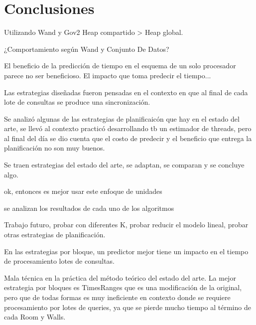 \chapter{Conclusiones}
\label{cap:conclu}

Utilizando Wand y Gov2 Heap compartido > Heap global.

¿Comportamiento según Wand y Conjunto De Datos? 

El beneficio de la predicción de tiempo en el esquema de un solo procesador parece no ser beneficioso. 
El impacto que toma predecir el tiempo...

Las estrategias diseñadas fueron pensadas en el contexto en que al final de cada lote de consultas se produce una sincronización.

Se analizó algunas de las estrategias de planificaicón que hay en el estado del arte, se llevó al contexto practicó desarrollando tb un estimador de threads, pero al final del día se dio cuenta que el costo de predecir y el beneficio que entrega la planificación no son muy buenos.

Se traen estrategias del estado del arte, se adaptan, se comparan y se concluye algo.

ok, entonces es mejor usar este enfoque de unidades

se analizan los resultados de cada uno de los algoritmos

Trabajo futuro, probar con diferentes K, probar reducir el modelo lineal, probar otras estrategias de planificación.

En las estrategias por bloque, un predictor mejor tiene un impacto en el tiempo de procesamiento lotes de consultas.

Mala técnica en la práctica del método teórico del estado del arte. La mejor estrategia por bloques es TimesRanges que es una modificación de la original, pero que de todas formas es muy ineficiente en contexto donde se requiere procesamiento por lotes de queries, ya que se pierde mucho tiempo al término de cada Room y Walls. 
